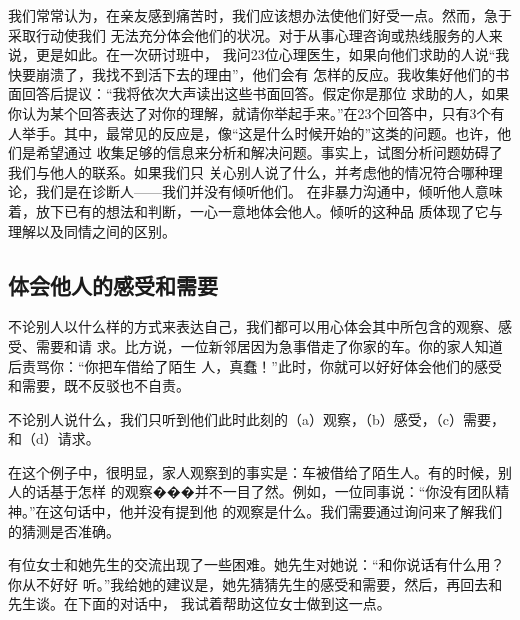 \documentclass{ctexart}
\begin{document}
我们常常认为，在亲友感到痛苦时，我们应该想办法使他们好受一点。然而，急于采取行动使我们
无法充分体会他们的状况。对于从事心理咨询或热线服务的人来说，更是如此。在一次研讨班中，
我问23位心理医生，如果向他们求助的人说``我快要崩溃了，我找不到活下去的理由''，他们会有
怎样的反应。我收集好他们的书面回答后提议：``我将依次大声读出这些书面回答。假定你是那位
求助的人，如果你认为某个回答表达了对你的理解，就请你举起手来。''在23个回答中，只有3个有
人举手。其中，最常见的反应是，像``这是什么时候开始的''这类的问题。也许，他们是希望通过
收集足够的信息来分析和解决问题。事实上，试图分析问题妨碍了我们与他人的联系。如果我们只
关心别人说了什么，并考虑他的情况符合哪种理论，我们是在诊断人------我们并没有倾听他们。
在非暴力沟通中，倾听他人意味着，放下已有的想法和判断，一心一意地体会他人。倾听的这种品
质体现了它与理解以及同情之间的区别。

\subsection{体会他人的感受和需要}

不论别人以什么样的方式来表达自己，我们都可以用心体会其中所包含的观察、感受、需要和请
求。比方说，一位新邻居因为急事借走了你家的车。你的家人知道后责骂你：``你把车借给了陌生
人，真蠢！''此时，你就可以好好体会他们的感受和需要，既不反驳也不自责。

不论别人说什么，我们只听到他们此时此刻的（a）观察，（b）感受，（c）需要，和（d）请求。

在这个例子中，很明显，家人观察到的事实是：车被借给了陌生人。有的时候，别人的话基于怎样
的观察���并不一目了然。例如，一位同事说：``你没有团队精神。''在这句话中，他并没有提到他
的观察是什么。我们需要通过询问来了解我们的猜测是否准确。

有位女士和她先生的交流出现了一些困难。她先生对她说：``和你说话有什么用？你从不好好
听。''我给她的建议是，她先猜猜先生的感受和需要，然后，再回去和先生谈。在下面的对话中，
我试着帮助这位女士做到这一点。
\end{document}

